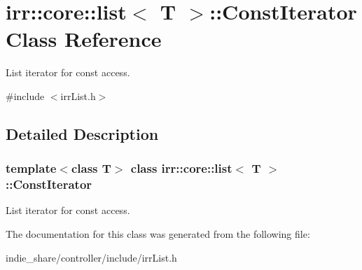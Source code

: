 \hypertarget{classirr_1_1core_1_1list_1_1ConstIterator}{}\section{irr\+:\+:core\+:\+:list$<$ T $>$\+:\+:Const\+Iterator Class Reference}
\label{classirr_1_1core_1_1list_1_1ConstIterator}


List iterator for const access.  




{\ttfamily \#include $<$irr\+List.\+h$>$}



\subsection{Detailed Description}
\subsubsection*{template$<$class T$>$\newline
class irr\+::core\+::list$<$ T $>$\+::\+Const\+Iterator}

List iterator for const access. 

The documentation for this class was generated from the following file\+:\begin{DoxyCompactItemize}
\item 
indie\+\_\+share/controller/include/irr\+List.\+h\end{DoxyCompactItemize}
